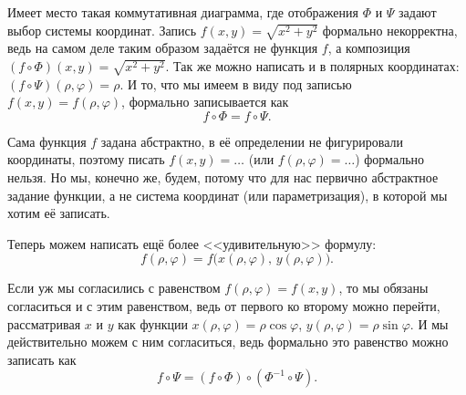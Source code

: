 Имеет место такая коммутативная диаграмма, где отображения $\Phi$ и $\Psi$ задают выбор системы координат. Запись $f(x, y) = \sqrt{x^2 + y^2}$ формально некорректна, ведь на самом деле таким образом задаётся не функция $f$, а композиция $(f \circ \Phi)(x, y) = \sqrt{x^2 + y^2}$. Так же можно написать и в полярных координатах: $(f \circ \Psi)(\rho, \varphi) = \rho$. И то, что мы имеем в виду под записью $f(x, y) = f(\rho, \varphi)$, формально записывается как
\[
	f \circ \Phi = f \circ \Psi.
\]

Сама функция $f$ задана абстрактно, в её определении не фигурировали координаты, поэтому писать $f(x, y) = \ldots$ (или $f(\rho, \varphi) = \ldots$) формально нельзя. Но мы, конечно же, будем, потому что для нас первично абстрактное задание функции, а не система координат (или параметризация), в которой мы хотим её записать.

Теперь можем написать ещё более <<удивительную>> формулу:
\[
	f(\rho, \varphi) = f\big(x(\rho, \varphi),\,y(\rho, \varphi)\big).
\]

Если уж мы согласились с равенством $f(\rho, \varphi) = f(x, y)$, то мы обязаны согласиться и с этим равенством, ведь от первого ко второму можно перейти, рассматривая $x$ и $y$ как функции $x(\rho, \varphi) = \rho\cos\varphi$, $y(\rho, \varphi) = \rho\sin\varphi$. И мы действительно можем с ним согласиться, ведь формально это равенство можно записать как
\[
	f \circ \Psi = (f \circ \Phi) \circ (\Phi^{-1} \circ \Psi).
\]

